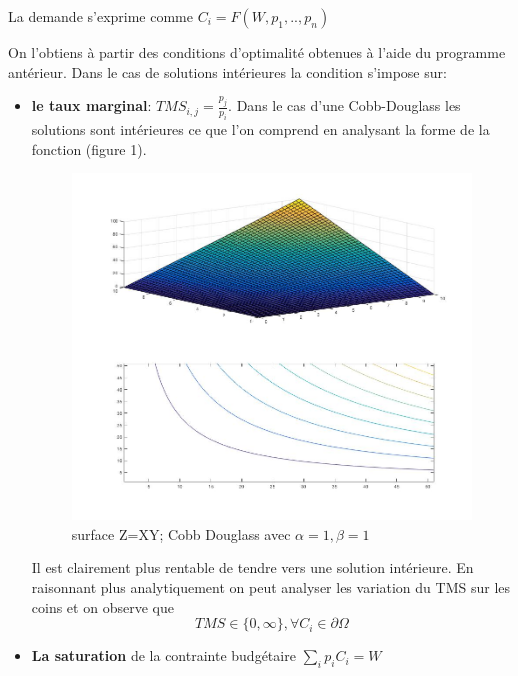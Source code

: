 La demande s'exprime comme $C_i=F(W,p_1,..,p_n)$

On l'obtiens à partir des conditions d'optimalité obtenues à l'aide du programme antérieur. Dans le cas de solutions intérieures la condition s'impose sur:
\begin{itemize}[label=]
\item \textbf{le taux marginal}: $TMS_{i,j}=\frac{p_j}{p_i}$. Dans le cas d'une Cobb-Douglass les solutions sont intérieures ce que l'on comprend en analysant la forme de la fonction (figure 1).
\newpage
\begin{figure}[h]
\begin{center}
\includegraphics[scale=0.3]{./img/IM1}
\caption{surface Z=XY; Cobb Douglass avec $\alpha =1 ,\beta = 1$}
\end{center}
\end{figure}

Il est clairement plus rentable de tendre vers une solution intérieure. En raisonnant plus analytiquement on peut analyser les variation du TMS sur les coins et on observe que 
$$ TMS \in  \{ 0,\infty \} , \forall C_i \in \partial \Omega $$

\item \textbf{La saturation} de la contrainte budgétaire $\sum_i p_i C_i = W$

\end{itemize}

